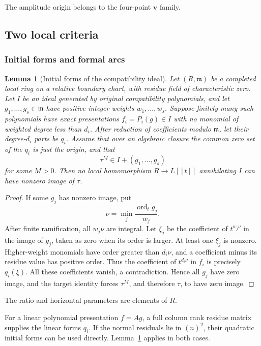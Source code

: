 \documentclass[11pt,a4paper]{article}
\numberwithin{equation}{section}
\theoremstyle{plain}
\newtheorem{lemma}[theorem]{Lemma}
\theoremstyle{definition}
\theoremstyle{remark}
\begin{document}
The amplitude origin belongs to the four-point $\boldsymbol v$ family.

\subsection{Two local criteria}\label{appr3:localcriteria}

\subsubsection{Initial forms and formal arcs}

\begin{lemma}[Initial forms of the compatibility ideal]\label{r3short:initial}
Let $(R,\mathfrak m)$ be a completed local ring on a relative boundary
chart, with residue field of characteristic zero. Let $I$ be an ideal generated by original compatibility
polynomials, and let $g_1,\ldots,g_s\in\mathfrak m$ have positive integer
weights $w_1,\ldots,w_s$. Suppose finitely many such polynomials have exact
presentations $f_i=P_i(g)\in I$ with no monomial of weighted degree
less than $d_i$. After reduction of coefficients modulo $\mathfrak m$,
let their degree-$d_i$ parts be $q_i$.
Assume that over an algebraic closure the common zero set of the $q_i$
is just the origin, and that
\[
 \tau^M\in I+(g_1,\ldots,g_s)
\]
for some $M>0$. Then no local homomorphism
$R\to L[[t]]$ annihilating $I$ can have nonzero image of $\tau$.
\end{lemma}
\begin{proof}
If some $g_j$ has nonzero image, put
\[
 \nu=\min_j\frac{\operatorname{ord}_t g_j}{w_j}.
\]
After finite ramification, all $w_j\nu$ are integral. Let $\xi_j$ be
the coefficient of $t^{w_j\nu}$ in the image of $g_j$, taken as zero
when its order is larger. At least one $\xi_j$ is nonzero. Higher-weight
monomials have order greater than $d_i\nu$, and a coefficient minus its
residue value has positive order. Thus the coefficient of
$t^{d_i\nu}$ in $f_i$ is precisely $q_i(\xi)$. All these coefficients
vanish, a contradiction. Hence all $g_j$ have zero image, and the target
identity forces $\tau^M$, and therefore $\tau$, to have zero image.
\end{proof}

The ratio and horizontal parameters are elements of $R$.

For a linear polynomial presentation $f=Ag$, a full column rank
residue matrix supplies the linear forms $q_i$. If the
normal residuals lie in $(n)^2$, their quadratic initial forms can be
used directly. Lemma~\ref{r3short:initial} applies in both cases.
\end{document}
